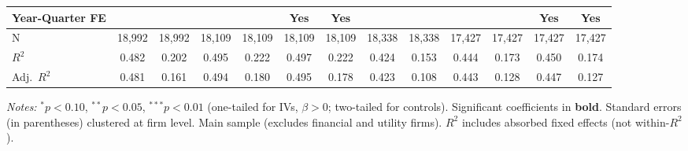 \begin{landscape}
\begin{table}[H]
\begin{tabular}{lcccccccccccc}
Year-Quarter FE &  &  &  &  & Yes & Yes &  &  &  &  & Yes & Yes \\
\midrule
N & 18,992 & 18,992 & 18,109 & 18,109 & 18,109 & 18,109 & 18,338 & 18,338 & 17,427 & 17,427 & 17,427 & 17,427 \\
$R^2$ & 0.482 & 0.202 & 0.495 & 0.222 & 0.497 & 0.222 & 0.424 & 0.153 & 0.444 & 0.173 & 0.450 & 0.174 \\
Adj.~$R^2$ & 0.481 & 0.161 & 0.494 & 0.180 & 0.495 & 0.178 & 0.423 & 0.108 & 0.443 & 0.128 & 0.447 & 0.127 \\
\bottomrule
\end{tabular}
\begin{minipage}{\linewidth}
\vspace{2pt}\scriptsize
\textit{Notes:} $^{*}p<0.10$, $^{**}p<0.05$, $^{***}p<0.01$ (one-tailed for IVs, $\beta > 0$; two-tailed for controls).
 Significant coefficients in \textbf{bold}.
 Standard errors (in parentheses) clustered at firm level.
 Main sample (excludes financial and utility firms).
 $R^2$ includes absorbed fixed effects (not within-$R^2$).
\end{minipage}
\end{table}
\end{landscape}